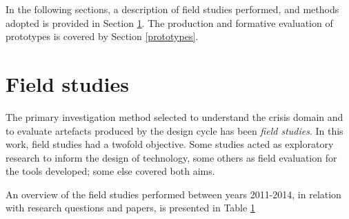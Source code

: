 In the following sections, a description of field studies performed, and methods adopted is provided in Section \ref{field-studies}. The production and formative evaluation of prototypes is covered by Section \ref{prototypes}.

\section{Field studies}\label{field-studies}

The primary investigation method selected to understand the crisis domain and to evaluate artefacts produced by the design cycle has been \emph{field studies}. In this work, field studies had a twofold objective. Some studies acted as exploratory research to inform the design of technology, some others as field evaluation for the tools developed; some else covered both aims.

An overview of the field studies performed between years 2011-2014, in relation with research questions and papers, is presented in Table \ref{field-studies}

